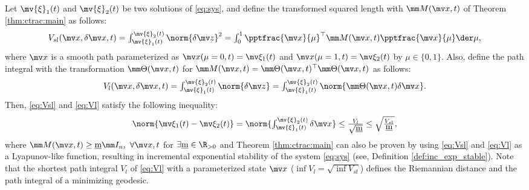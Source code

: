 \begin{theorem}
    Let $\mv{\xi}_1(t)$ and $\mv{\xi}_2(t)$ be two solutions of \eqref{eq:sys}, and define the transformed squared length with $\mm M(\bdx,t)$ of Theorem \ref{thm:ctrac:main} as follows:
    \begin{equation}
        V_{sl}(\bdx,\delta\bdx,t)
        =
        \textstyle\int_{\mv{\xi}_1(t)}^{\mv{\xi}_2(t)}
        \norm{\delta\bdz}^2
        =
        \textstyle\int_0^1
        \pptfrac{\bdx}{\mu}^\top
        \mm M(\bdx,t)
        \pptfrac{\bdx}{\mu}
        \der\mu
        ,
        \label{eq:Vsl}
    \end{equation}
    where $\bdx$ is a smooth path parameterized as $\bdx(\mu=0,t)=\mv\xi_1(t)$ and $\bdx(\mu=1,t)=\mv\xi_2(t)$ by $\mu\in\{0,1\}$.
    Also, define the path integral with the transformation $\mm\Theta(\bdx,t)$ for $\mm M(\bdx,t)=\mm\Theta(\bdx,t)^\top\mm\Theta(\bdx,t)$ as follows:
    \begin{equation}
        V_{l}(\bdx,\delta\bdx,t)
        =
        \textstyle\int_{\mv{\xi}_1(t)}^{\mv{\xi}_2(t)}
        \norm{\delta\bdz}
        =
        \textstyle\int_{\mv{\xi}_1(t)}^{\mv{\xi}_2(t)}
        \norm{\mm\Theta(\bdx,t)\delta\bdx}
        .
        \label{eq:Vl}
    \end{equation}
    Then, \eqref{eq:Vsl} and \eqref{eq:Vl} satisfy the following inequality:
    \begin{equation}
        \norm{\mv\xi_1(t)-\mv\xi_2(t)}
        =
        \norm{
            \textstyle\int_{\mv{\xi}_1(t)}^{\mv{\xi}_2(t)}
            \delta\bdx
        }
        \le
        \tfrac{V_{l}}{\sqrt{\underbar{m}}}
        \le
        \sqrt{\tfrac{V_{sl}}{\underbar{m}}}
        ,
        \label{eq:xi_x_Vl_Vsl}
    \end{equation}
    where $\mm M(\bdx,t) \ge \underbar{m}\mm I_n,\ \forall \bdx, t$ for $\exists\underbar{m}\in\R_{>0}$ and Theorem \ref{thm:ctrac:main} can also be proven by using \eqref{eq:Vsl} and \eqref{eq:Vl} as a Lyapunov-like function, resulting in incremental exponential stability of the system \eqref{eq:sys} (see, Definition \ref{def:inc_exp_stable}).
    Note that the shortest path integral $V_l$ of \eqref{eq:Vl} with a parameterized state $\bdx$ (\ie $\inf{V_l}=\sqrt{\inf{V_{sl}}}$) defines the Riemannian distance and the path integral of a minimizing geodesic.
\end{theorem}

